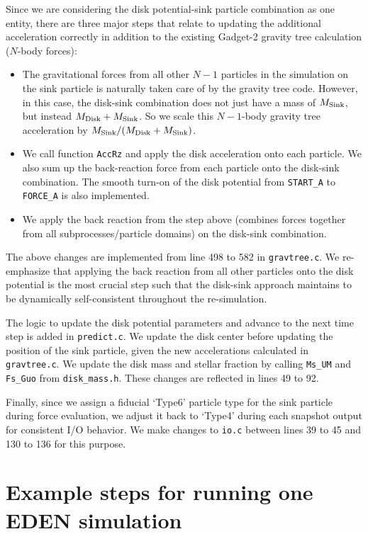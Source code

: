 \documentclass[12pt]{article}
\begin{document}
    Since we are considering the disk potential-sink particle combination as one entity, there are three major steps that relate to updating the additional acceleration correctly in addition to the existing Gadget-2 gravity tree calculation ($N$-body  forces): 
    \begin{itemize}
    \item The gravitational forces from all other $N-1$ particles in the simulation on the sink particle is naturally taken care of by the gravity tree code. However, in this case, the disk-sink combination does not just have a mass of $M_{\rm Sink}$, but instead $M_{\rm Disk} + M_{\rm Sink}$. So we scale this $N-1$-body gravity tree acceleration by $M_{\rm Sink}/ (M_{\rm Disk} + M_{\rm Sink})$.
    \item We call function \texttt{AccRz} and apply the disk acceleration onto each particle. We also sum up the back-reaction force from each particle onto the disk-sink combination. The smooth turn-on of the disk potential from \texttt{START\_A} to \texttt{FORCE\_A} is also implemented.
    \item We apply the back reaction from the step above (combines forces together from all subprocesses/particle domains) on the disk-sink combination.
    \end{itemize}
    The above changes are implemented from line 498 to 582 in \texttt{gravtree.c}. We re-emphasize that applying the back reaction from all other particles onto the disk potential is the most crucial step such that the disk-sink approach maintains to be dynamically self-consistent throughout the re-simulation. 

    The logic to update the disk potential parameters and advance to the next time step is added in \texttt{predict.c}. We update the disk center before updating the position of the sink particle, given the new accelerations calculated in \texttt{gravtree.c}. We update the disk mass and stellar fraction by calling \texttt{Ms\_UM} and \texttt{Fs\_Guo} from \texttt{disk\_mass.h}. These changes are reflected in lines 49 to 92.

    Finally, since we assign a fiducial `Type6' particle type for the sink particle during force evaluation, we adjust it back to `Type4' during each snapshot output for consistent I/O behavior. We make changes to \texttt{io.c} between lines 39 to 45 and 130 to 136 for this purpose.
    
	\section{Example steps for running one EDEN simulation}
\end{document}

